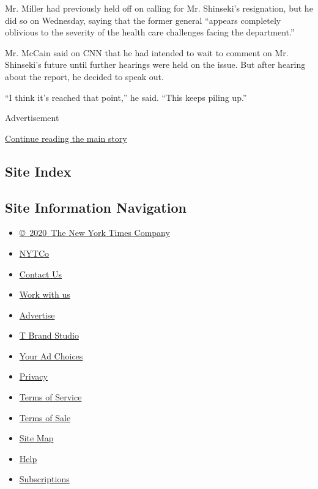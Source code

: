 Mr. Miller had previously held off on calling for Mr. Shinseki's
resignation, but he did so on Wednesday, saying that the former general
``appears completely oblivious to the severity of the health care
challenges facing the department.''

Mr. McCain said on CNN that he had intended to wait to comment on Mr.
Shinseki's future until further hearings were held on the issue. But
after hearing about the report, he decided to speak out.

``I think it's reached that point,'' he said. ``This keeps piling up.''

Advertisement

\protect\hyperlink{after-bottom}{Continue reading the main story}

\hypertarget{site-index}{%
\subsection{Site Index}\label{site-index}}

\hypertarget{site-information-navigation}{%
\subsection{Site Information
Navigation}\label{site-information-navigation}}

\begin{itemize}
\tightlist
\item
  \href{https://help.nytimes3xbfgragh.onion/hc/en-us/articles/115014792127-Copyright-notice}{©~2020~The
  New York Times Company}
\end{itemize}

\begin{itemize}
\tightlist
\item
  \href{https://www.nytco.com/}{NYTCo}
\item
  \href{https://help.nytimes3xbfgragh.onion/hc/en-us/articles/115015385887-Contact-Us}{Contact
  Us}
\item
  \href{https://www.nytco.com/careers/}{Work with us}
\item
  \href{https://nytmediakit.com/}{Advertise}
\item
  \href{http://www.tbrandstudio.com/}{T Brand Studio}
\item
  \href{https://www.nytimes3xbfgragh.onion/privacy/cookie-policy\#how-do-i-manage-trackers}{Your
  Ad Choices}
\item
  \href{https://www.nytimes3xbfgragh.onion/privacy}{Privacy}
\item
  \href{https://help.nytimes3xbfgragh.onion/hc/en-us/articles/115014893428-Terms-of-service}{Terms
  of Service}
\item
  \href{https://help.nytimes3xbfgragh.onion/hc/en-us/articles/115014893968-Terms-of-sale}{Terms
  of Sale}
\item
  \href{https://spiderbites.nytimes3xbfgragh.onion}{Site Map}
\item
  \href{https://help.nytimes3xbfgragh.onion/hc/en-us}{Help}
\item
  \href{https://www.nytimes3xbfgragh.onion/subscription?campaignId=37WXW}{Subscriptions}
\end{itemize}
